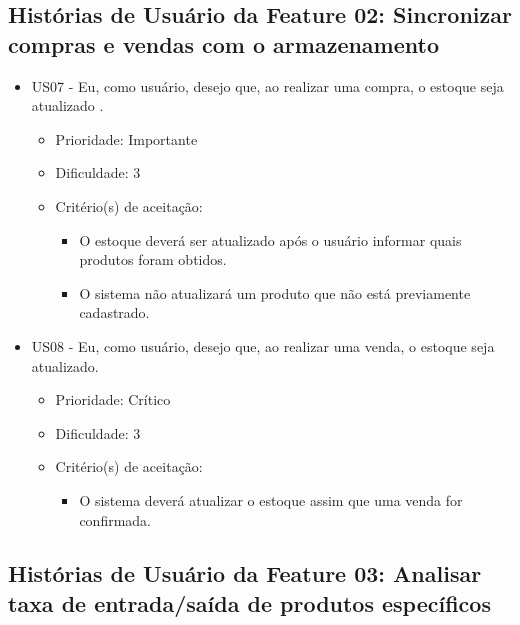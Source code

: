\subsection{Histórias de Usuário da Feature 02: Sincronizar compras e vendas com o armazenamento}
\begin{itemize}

\item US07 - Eu, como usuário, desejo que, ao realizar uma compra, o estoque seja atualizado .
    \begin{itemize}
    \item Prioridade: Importante
    \item Dificuldade: 3
    \item Critério(s) de aceitação:
			\begin{itemize}
				\item O estoque deverá ser atualizado após o usuário informar quais produtos foram obtidos.
				\item O sistema não atualizará um produto que não está previamente cadastrado.
			\end{itemize}
    \end{itemize}

\item US08 - Eu, como usuário, desejo que, ao realizar uma venda, o estoque seja atualizado.
    \begin{itemize}
    \item Prioridade: Crítico
    \item Dificuldade: 3
    \item Critério(s) de aceitação:
			\begin{itemize}
				\item O sistema deverá atualizar o estoque assim que uma venda for confirmada.
			\end{itemize}
    \end{itemize}

\end{itemize}

\subsection{Histórias de Usuário da Feature 03: Analisar taxa de entrada/saída de produtos específicos}

